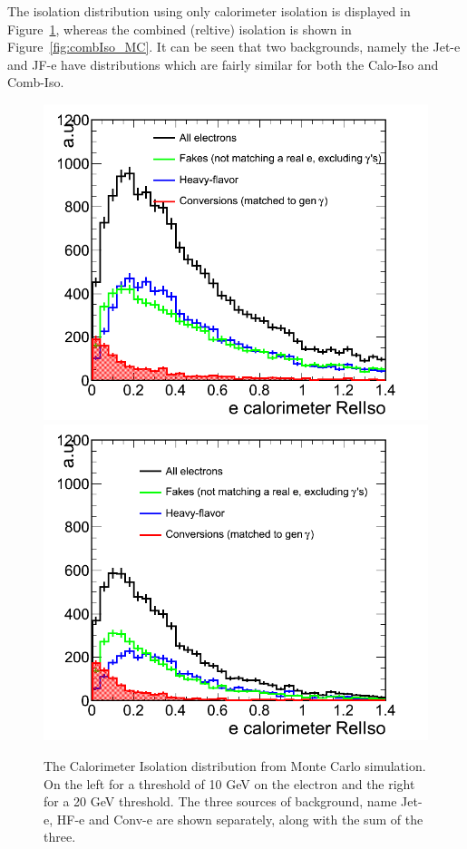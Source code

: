 The isolation distribution using only calorimeter isolation is displayed in Figure~\ref{fig:caloIso_MC}, whereas the combined (reltive) isolation is shown in Figure~\ref{fig:combIso_MC}.  It can be seen that two backgrounds, namely the Jet-e and JF-e have distributions which are fairly similar for both the Calo-Iso and Comb-Iso.
\begin{figure}[htb!]
\centering
\includegraphics[scale=0.28]{Plots/caloIso_pt10_MC.png}
\includegraphics[scale=0.28]{Plots/caloIso_pt20_MC.png}
\caption{The Calorimeter Isolation distribution from Monte Carlo simulation.  On the left for a threshold of 10 GeV on the electron and the right for a 20 GeV threshold.  The three sources of background, name Jet-e, HF-e and Conv-e are shown separately, along with the sum of the three.}\label{fig:caloIso_MC}
\end{figure}

